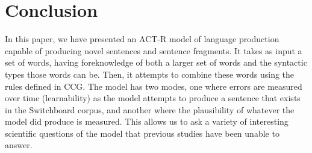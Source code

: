 \section{Conclusion}
In this paper, we have presented an ACT-R model of language production capable of producing novel sentences and sentence fragments. It takes as input a set of words, having foreknowledge of both a larger set of words and the syntactic types those words can be. Then, it attempts to combine these words using the rules defined in CCG. The model has two modes, one where errors are measured over time (learnability) as the model attempts to produce a sentence that exists in the Switchboard corpus, and another where the plausibility of whatever the model did produce is measured. This allows us to ask a variety of interesting scientific questions of the model that previous studies have been unable to answer.